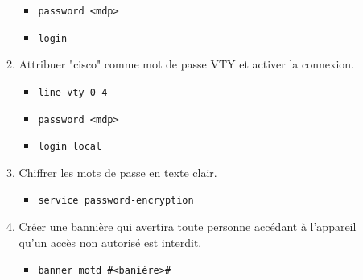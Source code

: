 \documentclass[a4paper]{article}
\begin{document}
\begin{itemize}
\begin{enumerate}
\begin{example}
\begin{itemize}
            \item \texttt{password <mdp>}
            \item \texttt{login}
        \end{itemize}
    \end{example}
    \item Attribuer "cisco" comme mot de passe VTY et activer la connexion.
    \begin{example}
        \begin{itemize}
            \item \texttt{line vty 0 4}
            \item \texttt{password <mdp>}
            \item \texttt{login local}
        \end{itemize}
    \end{example}
    \item Chiffrer les mots de passe en texte clair.
    \begin{example}
        \begin{itemize}
            \item \texttt{service password-encryption}
        \end{itemize}
    \end{example}
    \item Créer une bannière qui avertira toute personne accédant à l'appareil qu'un accès non autorisé est interdit.
    \begin{example}
        \begin{itemize}
            \item \texttt{banner motd \#<banière>\#}
        \end{itemize}
    \end{example}
\end{enumerate}






\end{itemize}
\end{document}

